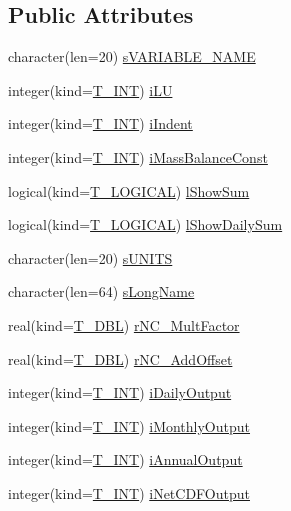 \subsection*{Public Attributes}
\begin{DoxyCompactItemize}
\item 
character(len=20) \hyperlink{typetest_1_1_t___s_t_a_t_s_af379002e440a9bee2e2f48c545a5bc90}{sVARIABLE\_\-NAME}
\item 
integer(kind=\hyperlink{namespacetest_a6f91ebd89b58cfcc5da99faed9385c1e}{T\_\-INT}) \hyperlink{typetest_1_1_t___s_t_a_t_s_acfc6193a73958523b2b6e9d493d80927}{iLU}
\item 
integer(kind=\hyperlink{namespacetest_a6f91ebd89b58cfcc5da99faed9385c1e}{T\_\-INT}) \hyperlink{typetest_1_1_t___s_t_a_t_s_a2b4462683c8bfced1f0970228541a23d}{iIndent}
\item 
integer(kind=\hyperlink{namespacetest_a6f91ebd89b58cfcc5da99faed9385c1e}{T\_\-INT}) \hyperlink{typetest_1_1_t___s_t_a_t_s_ab8406e15910cd4509bf6426b20dccb3b}{iMassBalanceConst}
\item 
logical(kind=\hyperlink{namespacetest_acdeac586276a7d1d394fb5eddc77fc3d}{T\_\-LOGICAL}) \hyperlink{typetest_1_1_t___s_t_a_t_s_a55ac267d57214ce01f87d4bfc5e2b3a5}{lShowSum}
\item 
logical(kind=\hyperlink{namespacetest_acdeac586276a7d1d394fb5eddc77fc3d}{T\_\-LOGICAL}) \hyperlink{typetest_1_1_t___s_t_a_t_s_adc30a11ba2bac07f0e5cee6a7e5e74a1}{lShowDailySum}
\item 
character(len=20) \hyperlink{typetest_1_1_t___s_t_a_t_s_a0240484711523e083bd3159282512b83}{sUNITS}
\item 
character(len=64) \hyperlink{typetest_1_1_t___s_t_a_t_s_a2561ed6b521149afe2dbfd5d6ef33b27}{sLongName}
\item 
real(kind=\hyperlink{namespacetest_af379b935264d350d76bf75331181e241}{T\_\-DBL}) \hyperlink{typetest_1_1_t___s_t_a_t_s_a6e6cd81fc30076dc8c5d802dee77902b}{rNC\_\-MultFactor}
\item 
real(kind=\hyperlink{namespacetest_af379b935264d350d76bf75331181e241}{T\_\-DBL}) \hyperlink{typetest_1_1_t___s_t_a_t_s_a0e98a9af6cb5ac17a252f4e86d150cf5}{rNC\_\-AddOffset}
\item 
integer(kind=\hyperlink{namespacetest_a6f91ebd89b58cfcc5da99faed9385c1e}{T\_\-INT}) \hyperlink{typetest_1_1_t___s_t_a_t_s_af6eab086c9edfda0f600c8380bb90a95}{iDailyOutput}
\item 
integer(kind=\hyperlink{namespacetest_a6f91ebd89b58cfcc5da99faed9385c1e}{T\_\-INT}) \hyperlink{typetest_1_1_t___s_t_a_t_s_aa292f0213f5d2c2f964f21bdc35680f2}{iMonthlyOutput}
\item 
integer(kind=\hyperlink{namespacetest_a6f91ebd89b58cfcc5da99faed9385c1e}{T\_\-INT}) \hyperlink{typetest_1_1_t___s_t_a_t_s_a2db35d4a8411e1128e29c279a71e02cf}{iAnnualOutput}
\item 
integer(kind=\hyperlink{namespacetest_a6f91ebd89b58cfcc5da99faed9385c1e}{T\_\-INT}) \hyperlink{typetest_1_1_t___s_t_a_t_s_a85598614bf320c3944f0a3a66e8181fa}{iNetCDFOutput}
\end{DoxyCompactItemize}


